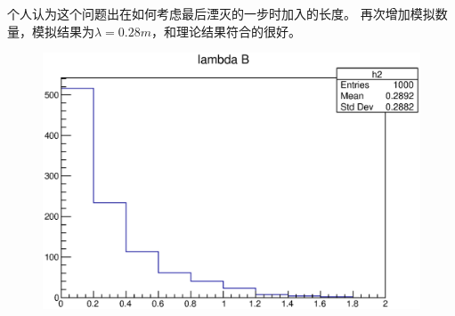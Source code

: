 \documentclass[UTF8]{ctexart}
\begin{document}
个人认为这个问题出在如何考虑最后湮灭的一步时加入的长度。
再次增加模拟数量，模拟结果为$\lambda=0.28m$，和理论结果符合的很好。
\begin{figure}[h]
\includegraphics[width=.8\textwidth]{distributionN1000.eps}
\end{figure}
\end{document}
